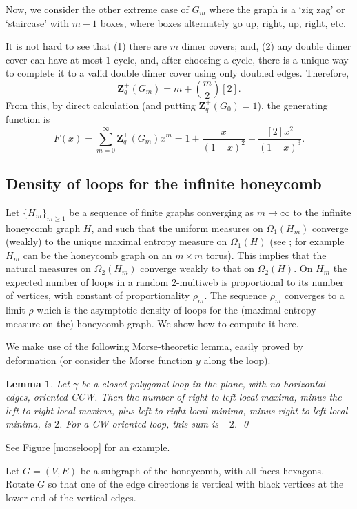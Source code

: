 \documentclass[12pt, reqno]{amsart}
\newtheorem{lemma}[theo]{Lemma}
\theoremstyle{definition}
\newcommand{\Zq}{\mathbf{Z}_q}%
\begin{document}
Now, we consider the other extreme case of $G_{m}$ where the graph is a `zig zag' or `staircase' with $m-1$ boxes,     where boxes alternately go up, right, up, right, etc.

It is not hard to see that (1) there are $m$ dimer covers; and, (2) any double dimer cover can have at most $1$ cycle, and, after choosing a cycle, there is a unique way to complete it to a valid double dimer cover using only doubled edges.  Therefore,     
$$ 
\Zq^+(G_m) = m + \binom{m}{2} [2]. 
$$ 
From this, by direct calculation (and putting $\Zq^+(G_0)=1$), the generating function is
$$ 
F(x) = \sum_{m=0}^\infty \Zq^+(G_m) x^m = 1+\frac{x}{(1-x)^2}+\frac{[2]x^2}{(1-x)^3}.
$$

\subsection{Density of loops for the infinite honeycomb}\label{loopdensity}

Let $\{H_m\}_{m\ge1}$ be a sequence of finite graphs converging as $m\to\infty$ to the infinite honeycomb graph $H$,   and such that the uniform measures on $\Omega_1(H_m)$ converge (weakly) to the unique maximal entropy measure on $\Omega_1(H)$   (see \cite{Kenyon.localstats}; for example $H_m$ can be the honeycomb graph on an $m\times m$ torus).     This implies that the natural measures on $\Omega_2(H_m)$ converge weakly  to that on $\Omega_2(H)$.   On $H_m$ the expected number of loops in a random $2$-multiweb is proportional to its number of vertices, with constant of proportionality $\rho_m$.   The sequence $\rho_m$ converges to a limit  $\rho$ which is the asymptotic density of loops for the (maximal entropy measure on the) honeycomb graph.  We show how to compute it here.

We make use of the following Morse-theoretic lemma, easily proved by deformation (or consider the Morse function $y$ along the loop).

\begin{lemma}\label{morse} 
Let $\gamma$ be a closed polygonal loop in the plane, with no horizontal edges, oriented CCW. Then the number of right-to-left local maxima, minus the left-to-right local maxima, plus left-to-right local minima, minus right-to-left local minima, is $2$. For a CW oriented loop, this sum is $-2$. 
\qed\end{lemma} 

See Figure \ref{morseloop} for an example.

Let $G=(V,E)$ be a subgraph of the honeycomb, with all faces hexagons.  Rotate $G$ so that one of the edge directions is vertical with black vertices at the lower end of the vertical edges.
\end{document}
